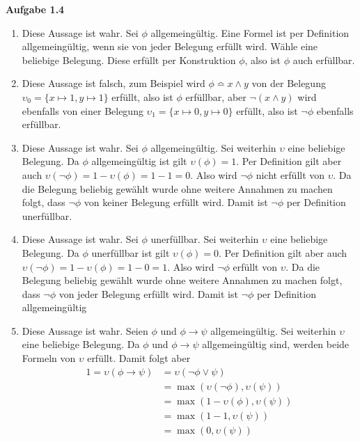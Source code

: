 \documentclass[a4paper,10pt]{article}
\begin{document}
\noindent\textbf{Aufgabe 1.4}\\
\begin{enumerate}
\item Diese Aussage ist wahr. Sei $\phi$ allgemeingültig. Eine Formel ist per Definition allgemeingültig, wenn sie von jeder Belegung erfüllt wird. Wähle eine beliebige Belegung. Diese erfüllt per Konstruktion $\phi$, also ist $\phi$ auch erfüllbar.
\item Diese Aussage ist falsch, zum Beispiel wird $\phi \bumpeq x \wedge y$ von der Belegung $\upsilon_0 = \{x \mapsto 1, y \mapsto 1\}$ erfüllt, also ist $\phi$ erfüllbar, aber $\neg(x \wedge y)$ wird ebenfalls von einer Belegung $\upsilon_1 = \{x \mapsto 0, y \mapsto 0\}$ erfüllt, also ist $\neg\phi$ ebenfalls erfüllbar.
\item Diese Aussage ist wahr. Sei $\phi$ allgemeingültig. Sei weiterhin $\upsilon$ eine beliebige Belegung. Da $\phi$ allgemeingültig ist gilt $\upsilon(\phi) = 1$. Per Definition gilt aber auch $\upsilon(\neg \phi) = 1 - \upsilon(\phi) = 1 - 1 = 0$. Also wird $\neg \phi$ nicht erfüllt von $\upsilon$. Da die Belegung beliebig gewählt wurde ohne weitere Annahmen zu machen folgt, dass $\neg \phi$ von keiner Belegung erfüllt wird. Damit ist $\neg\phi$ per Definition unerfüllbar.
\item Diese Aussage ist wahr. Sei $\phi$ unerfüllbar. Sei weiterhin $\upsilon$ eine beliebige Belegung. Da $\phi$ unerfüllbar ist gilt $\upsilon(\phi) = 0$. Per Definition gilt aber auch $\upsilon(\neg \phi) = 1 - \upsilon(\phi) = 1 - 0 = 1$. Also wird $\neg \phi$ erfüllt von $\upsilon$. Da die Belegung beliebig gewählt wurde ohne weitere Annahmen zu machen folgt, dass $\neg \phi$ von jeder Belegung erfüllt wird. Damit ist $\neg\phi$ per Definition allgemeingültig
\item Diese Aussage ist wahr. Seien $\phi$ und $\phi \rightarrow \psi$ allgemeingültig. Sei weiterhin $\upsilon$ eine beliebige Belegung. Da $\phi$ und $\phi \rightarrow \psi$ allgemeingültig sind, werden beide Formeln von $\upsilon$ erfüllt. Damit folgt aber 
\begin{align*}
1 = \upsilon(\phi \rightarrow \psi) & = \upsilon(\neg \phi \vee \psi) \\
& = \max(\upsilon(\neg \phi), \upsilon(\psi)) \\
& = \max(1 - \upsilon(\phi), \upsilon(\psi)) \\
& = \max(1 - 1, \upsilon(\psi)) \\
& = \max(0, \upsilon(\psi))
\end{align*} 

\end{enumerate}
\end{document}
